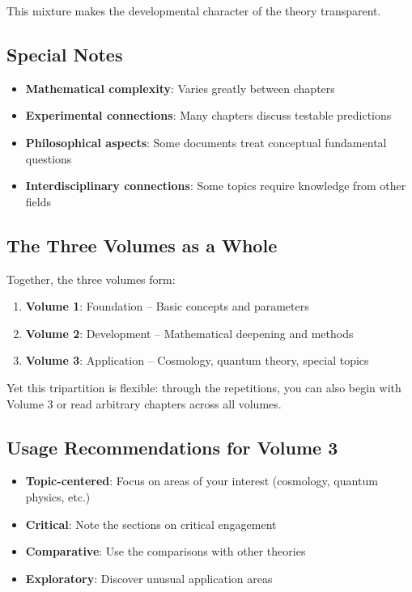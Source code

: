 This mixture makes the developmental character of the theory transparent.

\subsection*{Special Notes}

\begin{itemize}
\item \textbf{Mathematical complexity}: Varies greatly between chapters
\item \textbf{Experimental connections}: Many chapters discuss testable predictions
\item \textbf{Philosophical aspects}: Some documents treat conceptual fundamental questions
\item \textbf{Interdisciplinary connections}: Some topics require knowledge from other fields
\end{itemize}

\subsection*{The Three Volumes as a Whole}

Together, the three volumes form:

\begin{enumerate}
\item \textbf{Volume 1}: Foundation -- Basic concepts and parameters
\item \textbf{Volume 2}: Development -- Mathematical deepening and methods
\item \textbf{Volume 3}: Application -- Cosmology, quantum theory, special topics
\end{enumerate}

Yet this tripartition is flexible: through the repetitions, you can also begin with Volume 3 or read arbitrary chapters across all volumes.

\subsection*{Usage Recommendations for Volume 3}

\begin{itemize}
\item \textbf{Topic-centered}: Focus on areas of your interest (cosmology, quantum physics, etc.)
\item \textbf{Critical}: Note the sections on critical engagement
\item \textbf{Comparative}: Use the comparisons with other theories
\item \textbf{Exploratory}: Discover unusual application areas
\end{itemize}

